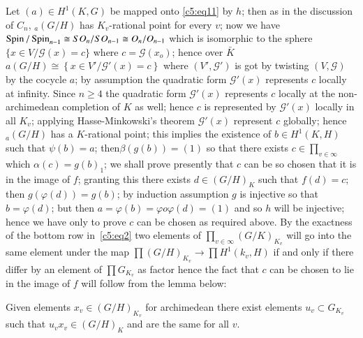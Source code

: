 Let $(a)\in H^1(K,G)$ be mapped onto \eqref{c5:eq11} by $h$; then as in the
discussion of $C_n$, ${}_a(G/H)$ has $K_v$-rational point for every
$v$; now we have $\operatorname{Spin}/ \operatorname{Spin}_{n-1} \cong SO_n /SO_{n-1} \cong
O_n/O_{n-1}$ which is isomorphic to the sphere $\{ x \in V /
\mathscr{G}(x) = c \}$ where $c = \mathscr{G}(x_o)$; hence over
$\bar{K}$ $a(G/H) \cong  \left \{ x \in V' \bigg/ \mathscr{G}' (x) = c
\right\}$ where $(V', \mathscr{G'})$ is got by twisting $(V,
\mathscr{G})$ by the cocycle $a$; by assumption the quadratic form
$\mathscr{G}'(x)$ represents $c$ locally at infinity. Since $n \ge 4$
the quadratic form $\mathscr{G}'(x)$ represents $c$ locally at the
non-archimedean completion of $K$ as well; hence $c$ is represented by
$\mathscr{G'}(x)$ locally in all $K_v$; applying Hasse-Minkowski's
theorem $\mathscr{G'}(x)$ represent $c$ globally; hence $_a(G/H)$ has
a $K$-rational point; this implies the existence of $b \in H^1 (K,H)$
such that $\psi(b) = a$; then\pageoriginale $\beta (g(b)) = (1)$ so
that there 
exists $c \in \prod\limits_{v \in \infty}$ which $\alpha (c) = g(b)_1$;
we shall prove presently that $c$ can be so chosen that it is  
in the image of $f$; granting this there exists $d \in (G/H)_K$ such
that $f(d) = c$; then $g(\varphi(d))= g(b)$; by induction assumption
$g$ is injective so that $b = \varphi (d)$; but then $a= \varphi (b)
=\varphi o \varphi(d)=(1)$ and so $h$ will be injective;  hence we have
only to prove $c$ can be chosen as required above. By the exactness of
the bottom row in~\eqref{c5:eq2} two elements of $\prod \limits_{v \in
  \infty}(G/K)_{K_v}$ will go into the same element under the map
$\prod (G/H)_{K_v}\to \prod H^1 (k_v,H)$ if and only if there differ
by an element of $\prod G_{K_v}$ as factor hence the fact that $c$ can
be chosen to lie in the image of $f$ will follow from the lemma below:  

\setcounter{lem}{0}
\begin{lem} %
Given elements $x_v \in (G/H)_{K_v}$ for archimedean there exist
elements $u_v \subset G_{K_v}$ such that $u_v x_v \in (G/H)_K$ and are
the same for all $v$. 
\end{lem}

